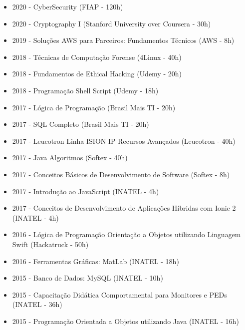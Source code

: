 \documentclass[10pt,a4paper,ragged2e, normalphoto]{altacv}
\begin{document}
\begin{fullwidth}

\begin{itemize}
    \item 2020 - CyberSecurity (FIAP - 120h)
    \item 2020 - Cryptography I (Stanford University over Coursera - 30h)
    \item 2019 - Soluções AWS para Parceiros: Fundamentos Técnicos (AWS - 8h)
    \item 2018 - Técnicas de Computação Forense (4Linux - 40h)
    \item 2018 - Fundamentos de Ethical Hacking (Udemy - 20h)
    \item 2018 - Programação Shell Script (Udemy - 18h)
    \item 2017 - Lógica de Programação (Brasil Mais TI - 20h)
    \item 2017 - SQL Completo (Brasil Mais TI - 20h)
    \item 2017 - Leucotron Linha ISION IP Recursos Avançados (Leucotron - 40h)
    \item 2017 - Java Algoritmos (Softex - 40h)
    \item 2017 - Conceitos Básicos de Desenvolvimento de Software (Softex - 8h)
    \item 2017 - Introdução ao JavaScript (INATEL - 4h)
    \item 2017 - Conceitos de Desenvolvimento de Aplicações Híbridas com Ionic 2 (INATEL - 4h)
    \item 2016 - Lógica de Programação Orientação a Objetos utilizando Linguagem Swift (Hackatruck - 50h)
    \item 2016 - Ferramentas Gráficas: MatLab (INATEL - 18h)
    \item 2015 - Banco de Dados: MySQL (INATEL - 10h)
    \item 2015 - Capacitação Didática Comportamental para Monitores e PEDs (INATEL - 36h)
    \item 2015 - Programação Orientada a Objetos utilizando Java (INATEL - 16h)
\end{itemize}

\end{fullwidth}
\end{document}
